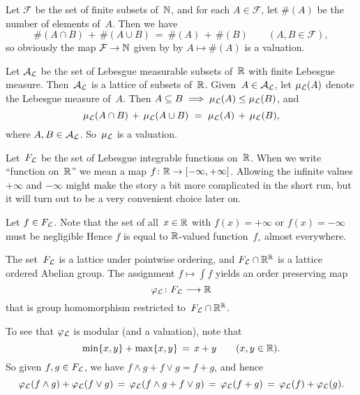 \documentclass[main.tex]{subfiles}
\begin{document}
\begin{ex}
Let $\mathcal{F}$ be the set of finite subsets of~$\mathbb{N}$,
and for each $A\in \mathcal{F}$,
let $\#(A)$ be the number of elements of~$A$.
Then we have 
\begin{equation*}
\#(A\cap B) \,+\, \#(A\cup B) \ =\ \#(A) \,+\, \#(B)
\qquad(A,B\in\mathcal{F}),
\end{equation*}
so obviously the map $\mathcal{F} \rightarrow \mathbb{N}$
given by by $A\mapsto \#(A)$ is a valuation.
\end{ex}

%
%
\begin{ex}
\label{E:lmeas-val}
Let $\mathcal{A}_{\mathcal{L}}$ be the set of Lebesgue measurable
subsets of~$\mathbb{R}$ with finite Lebesgue measure.
Then~$\mathcal{A}_{\mathcal{L}}$ is a lattice of subsets of~$\mathbb{R}$.
Given~$A\in\mathcal{A}_{\mathcal{L}}$,
let $\mu_{\mathcal{L}}(A)$ denote the Lebesgue measure of~$A$.
Then $A\subseteq B \implies \mu_{\mathcal{L}}(A)\leq \mu_{\mathcal{L}} (B)$,
and 
\begin{equation*}
\mu_{\mathcal{L}}(A\cap B) \,+\, \mu_{\mathcal{L}}(A\cup B) \ =\  \mu_{\mathcal{L}}(A) \,+\, \mu_{\mathcal{L}}(B),
\end{equation*}
where $A,B\in \mathcal{A}_{\mathcal{L}}$.
So~$\mu_{\mathcal{L}}$ is a valuation.
\end{ex}

%
%
\begin{ex}
\label{E:int-val}
Let~$F_{\mathcal{L}}$ be the set of
Lebesgue integrable functions on~$\mathbb{R}$.
When we write ``function on~$\mathbb{R}$''
we mean a map $f\colon \mathbb{R} \rightarrow {[-\infty,+\infty]}$.
Allowing the infinite values $+\infty$
and $-\infty$
might make the story a bit more complicated
in the short run,
but it will turn out to be a very convenient choice later on.

Let $f\in F_{\mathcal{L}}$.
Note that the set of all~$x\in \mathbb{R}$
with $f(x)=+\infty$ or $f(x)=-\infty$
must be negligible
Hence $f$ is equal to $\mathbb{R}$-valued
function~$f_\circ$ almost everywhere.

The set~$F_{\mathcal{L}}$ is a lattice
under pointwise ordering,
and  $F_{\mathcal{L}}\cap \mathbb{R}^{\mathbb{R}}$
is a lattice ordered Abelian group.
The assignment $f\mapsto \int f$ 
yields an order preserving map
\begin{equation*}
\varphi_{\mathcal{L}}\colon F_{\mathcal{L}}\longrightarrow \mathbb{R}
\end{equation*}
that is group homomorphism
restricted to~$F_{\mathcal{L}}\cap \mathbb{R}^{\mathbb{R}}$.

To see that $\varphi_{\mathcal{L}}$ is modular (and a valuation),
note that
\begin{equation*}
\min\{x,y\}+\max\{x,y\} \,=\, x+y\qquad(x,y\in \mathbb{R}).
\end{equation*}
So given $f,g\in F_{\mathcal{L}}$,
we have $f\wedge g + f \vee g = f+ g$,
and hence
\begin{equation*}
\varphi_{\mathcal{L}}(f\wedge g) + \varphi_{\mathcal{L}}(f\vee g) 
\,=\,\varphi_{\mathcal{L}}(f\wedge g + f\vee g)
\,=\, \varphi_{\mathcal{L}}(f+g)
\,=\, \varphi_{\mathcal{L}} (f)+\varphi_{\mathcal{L}}(g).
\end{equation*}
\end{ex}
\end{document}

